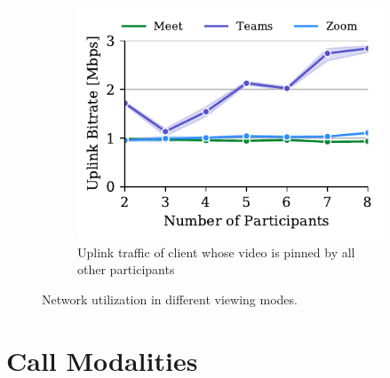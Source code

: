 \begin{figure}[tb!]
\begin{subfigure}[t]{.33\textwidth}
    \label{fig:gallery-send}
\end{subfigure}
\hfill
\begin{subfigure}[t]{.33\textwidth}
  \centering
   \captionsetup{width=.9\linewidth}
    \includegraphics[width=1\textwidth,keepaspectratio]{../figures/modality/speaker_send.pdf}
    \caption{Uplink traffic of client whose video is pinned by all other participants}
    \label{fig:speaker-send}
\end{subfigure}
\caption{Network utilization in different viewing modes.}
\label{fig:viewing-mode}
\end{figure}




\section{Call Modalities}\label{sec:usage_modality}

